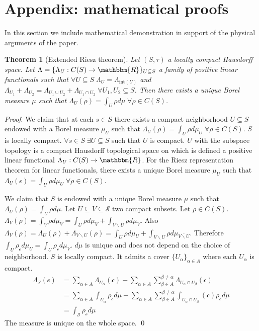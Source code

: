 \documentclass[aps,pra,10pt,twocolumn,floatfix,nofootinbib]{revtex4-1}
\numberwithin{equation}{section}
\newtheorem{thrm}[equation]{Theorem}
\theoremstyle{definition}
\renewenvironment{proof}{\emph{Proof}.}{\qed}
\begin{document}
\section{Appendix: mathematical proofs}

In this section we include mathematical demonstration in support of the physical arguments of the paper.

\begin{thrm}[Extended Riesz theorem]\label{extended_riesz_theorem}
	Let $(S, \tau)$ a locally compact Hausdorff space. Let $\Lambda = \{\Lambda_U : C(S) \rightarrow \mathbbm{R}\}_{U \subseteq S}$ a family of positive linear functionals such that $\forall U \subseteq S \; \Lambda_U = \Lambda_{\mathrm{int}(U)}$ and $\Lambda_{U_1} + \Lambda_{U_2} = \Lambda_{U_1 \cup U_2} + \Lambda_{U_1 \cap U_2} \; \forall U_1, U_2 \subseteq S$. Then there exists a unique Borel measure $\mu$ such that $\Lambda_U (\rho) = \int_{U} \rho d\mu \; \forall \rho \in C(S)$.
\end{thrm}

\begin{proof}
	We claim that at each $s \in S$ there exists a compact neighborhood $U \subseteq S$ endowed with a Borel measure $\mu_U$ such that $\Lambda_U (\rho) = \int_U \rho d \mu_U \; \forall \rho \in C(S)$. $S$ is locally compact. $\forall s \in S \; \exists U \subseteq S$ such that $U$ is compact. $U$ with the subspace topology is a compact Hausdorff topological space on which is defined a positive linear functional $\Lambda_U : C(S) \rightarrow \mathbbm{R}$. For the Riesz representation theorem for linear functionals, there exists a unique Borel measure $\mu_U$ such that $\Lambda_U (\mathcal{c}) = \int_U \rho d \mu_U \; \forall \rho \in C(S)$.
	
	We claim that $S$ is endowed with a unique Borel measure $\mu$ such that $\Lambda_U (\rho) = \int_U \rho d \mu$. Let $U \subseteq V \subseteq \mathcal{S}$ two compact subsets. Let $\rho \in C(S)$. $\Lambda_V (\rho) = \int_V \rho d \mu_V = \int_U \rho d \mu_V + \int_{V\backslash U} \rho d \mu_V$. Also $\Lambda_V (\rho) = \Lambda_U (\rho) + \Lambda_{V\backslash U} (\rho) = \int_U \rho d \mu_U + \int_{V \backslash U} \rho d \mu_{\overline{V \backslash U}} $. Therefore $\int_{U} \rho_{\mathcal{c}} d \mu_U = \int_{U} \rho_{\mathcal{c}} d \mu_V$. $d\mu$ is unique and does not depend on the choice of neighborhood. $S$ is locally compact. It admits a cover $\{U_\alpha\}_{\alpha \in A}$ where each $U_\alpha$ is compact.
	\begin{align*}
	\Lambda_{\mathcal{S}}(\mathcal{c}) &= \sum \limits_{\alpha \in A} \Lambda_{U_\alpha}(\mathcal{c}) - \sum \limits_{\alpha \in A} \sum \limits_{\beta \in A}^{\beta \neq\alpha} \Lambda_{U_\alpha \cap U_\beta}(\mathcal{c}) \\
	&= \sum \limits_{\alpha \in A} \int_{U_\alpha} \rho_{\mathcal{c}} d\mu - \sum \limits_{\alpha \in A} \sum \limits_{\beta \in A}^{\beta \neq\alpha} \int_{U_\alpha \cap U_\beta}(\mathcal{c}) \rho_{\mathcal{c}} d\mu \\
	&= \int_{\mathcal{S}} \rho_{\mathcal{c}} d\mu
	\end{align*}
	The measure is unique on the whole space.
\end{proof}
\end{document}
